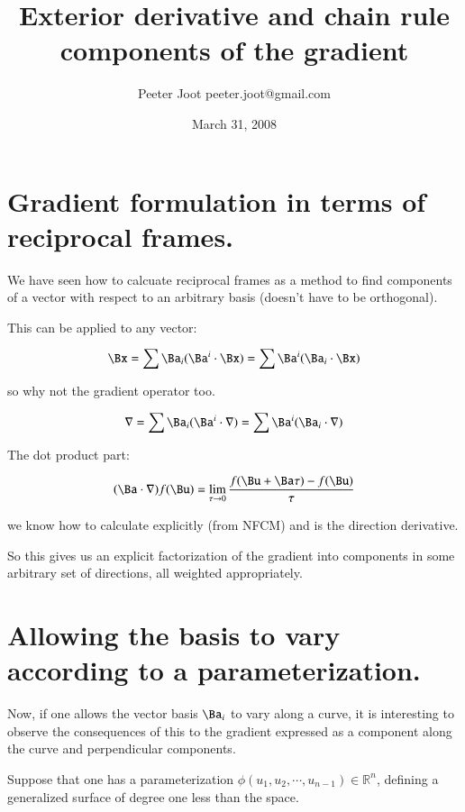 \documentclass{article}      %
\title{ Exterior derivative and chain rule components of the gradient } %
\author{Peeter Joot \quad peeter.joot@gmail.com}         %
\date{ March 31, 2008}        %
\newcommand{\grad}[0]{\nabla}
\begin{document}

\maketitle{}

\section{ Gradient formulation in terms of reciprocal frames. }

We have seen how to calcuate reciprocal frames as a method to find
components of a vector with respect to an arbitrary basis (doesn't have
to be orthogonal).

This can be applied to any vector:

\[
\Bx = \sum \Ba_i (\Ba^i \cdot \Bx) = \sum \Ba^i (\Ba_i \cdot \Bx)
\]

so why not the gradient operator too.

\begin{equation}
\grad = \sum \Ba_i (\Ba^i \cdot \grad) = \sum \Ba^i (\Ba_i \cdot \grad)
\end{equation}

The dot product part:

\begin{equation}
(\Ba \cdot \grad) f(\Bu) = \lim_{\tau \rightarrow 0}
\frac{ f(\Bu + \Ba \tau) - f(\Bu ) }{ \tau }
\end{equation}

we know how to calculate explicitly (from NFCM) and is the direction
derivative.

So this gives us an explicit factorization of the gradient into components
in some arbitrary set of directions, all weighted appropriately.

\section{ Allowing the basis to vary according to a parameterization. }

Now, if one allows the vector basis ${\Ba_i}$ to vary along a curve, it
is interesting to observe the consequences of this to the gradient expressed
as a component along the curve and perpendicular components.

Suppose that one has a parameterization $\phi(u_1, u_2, \cdots, u_{n-1}) \in \mathbb{R}^n$, defining a generalized surface of degree one less than the space.
\end{document}
